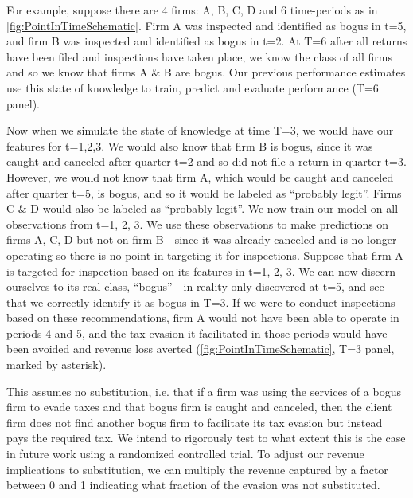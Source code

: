 For example, suppose there are 4 firms: A, B, C, D and 6 time-periods as in \cref{fig:PointInTimeSchematic}. Firm A was inspected and identified as bogus in t=5, and firm B was inspected and identified as bogus in t=2. At T=6 after all returns have been filed and inspections have taken place, we know the class of all firms and so we know that firms A \& B are bogus. Our previous performance estimates use this state of knowledge to train, predict and evaluate performance (T=6 panel). 

Now when we simulate the state of knowledge at time T=3, we would have our features for t=1,2,3. We would also know that firm B is bogus, since it was caught and canceled after quarter t=2 and so did not file a return in quarter t=3. However, we would not know that firm A, which would be caught and canceled after quarter t=5, is bogus, and so it would be labeled as ``probably legit''. Firms C \& D would also be labeled as ``probably legit''. We now train our model on all observations from t=1, 2, 3. We use these observations to make predictions on firms A, C, D but not on firm B - since it was already canceled and is no longer operating so there is no point in targeting it for inspections. Suppose that firm A is targeted for inspection based on its features in t=1, 2, 3. We can now discern ourselves to its real class, ``bogus'' - in reality only discovered at t=5, and see that we correctly identify it as bogus in T=3. If we were to conduct inspections based on these recommendations, firm A would not have been able to operate in periods 4 and 5, and the tax evasion it facilitated in those periods would have been avoided and revenue loss averted (\cref{fig:PointInTimeSchematic}, T=3 panel, marked by asterisk). 

This assumes no substitution, i.e. that if a firm was using the services of a bogus firm to evade taxes and that bogus firm is caught and canceled, then the client firm does not find another bogus firm to facilitate its tax evasion but instead pays the required tax. We intend to rigorously test to what extent this is the case in future work using a randomized controlled trial. To adjust our revenue implications to substitution, we can multiply the revenue captured by a factor between 0 and 1 indicating what fraction of the evasion was not substituted.

